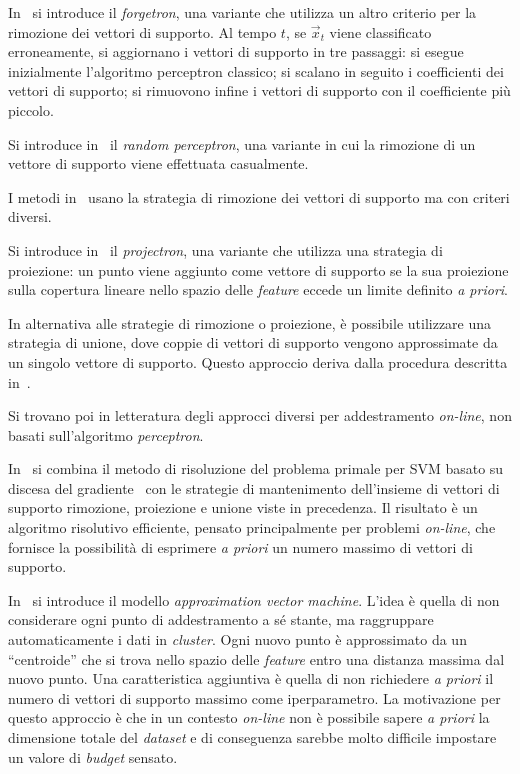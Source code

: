 In~\cite{2005_forgetron} si introduce il \emph{forgetron}, una variante che utilizza un altro criterio per la rimozione dei vettori di supporto. 
Al tempo $t$, se $\Vec{x}_t$ viene classificato erroneamente, si aggiornano i vettori di supporto in tre passaggi: si esegue inizialmente l'algoritmo perceptron classico; si scalano in seguito i coefficienti dei vettori di supporto; si rimuovono infine i vettori di supporto con il coefficiente più piccolo.

Si introduce in~\cite{2007_random_removal} il \emph{random perceptron}, una variante in cui la rimozione di un vettore di supporto viene effettuata casualmente.

I metodi in~\cite{2003_online_classification_on_a_budget,2005_forgetron,2007_random_removal} usano la strategia di rimozione dei vettori di supporto ma con criteri diversi.

Si introduce in~\cite{2008_projectron} il \emph{projectron}, una variante che utilizza una strategia di proiezione: un punto viene aggiunto come vettore di supporto se la sua proiezione sulla copertura lineare nello spazio delle \emph{feature} eccede un limite definito \emph{a priori}. 
%

In alternativa alle strategie di rimozione o proiezione, è possibile utilizzare una strategia di unione, dove coppie di vettori di supporto vengono approssimate da un singolo vettore di supporto.
Questo approccio deriva dalla procedura descritta in~\cite{2005_merging_strategy}.

Si trovano poi in letteratura degli approcci diversi per addestramento \emph{on-line}, non basati sull'algoritmo \emph{perceptron}.

In~\cite{2012_bsgd} si combina il metodo di risoluzione del problema primale per SVM basato su discesa del gradiente~\cite{2007_chappelle_training_svm_primal, pegasos_solver} con le strategie di mantenimento dell'insieme di vettori di supporto rimozione, proiezione e unione viste in precedenza. 
Il risultato è un algoritmo risolutivo efficiente, pensato principalmente per problemi \emph{on-line}, che fornisce la possibilità di esprimere \emph{a priori} un numero massimo di vettori di supporto.

In~\cite{2017_approximation_vm} si introduce il modello \emph{approximation vector machine}. 
L'idea è quella di non considerare ogni punto di addestramento a sé stante, ma raggruppare automaticamente  i dati in \emph{cluster}. 
Ogni nuovo punto è approssimato da un ``centroide'' che si trova nello spazio delle \emph{feature} entro una distanza massima dal nuovo punto. 
Una caratteristica aggiuntiva è quella di non richiedere \emph{a priori} il numero di vettori di supporto massimo come iperparametro.
La motivazione per questo approccio è che in un contesto \emph{on-line} non è possibile sapere \emph{a priori} la dimensione totale del \emph{dataset} e di conseguenza sarebbe molto difficile impostare un valore di \emph{budget} sensato. 


